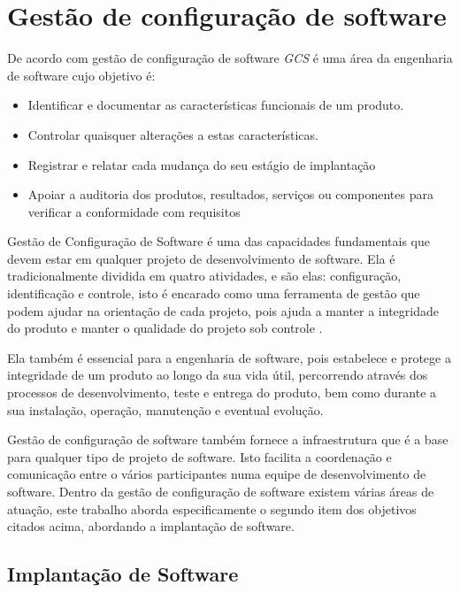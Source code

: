 \chapter{Gestão de configuração de software}
\label{cap-referencial}

De acordo com  gestão de configuração de software \textit{GCS} 
é uma área da engenharia de software cujo objetivo é:

\begin{itemize}
  \item Identificar e documentar as características funcionais de
  um produto.
  \item Controlar quaisquer alterações a estas características.
  \item Registrar e relatar cada mudança do seu estágio de implantação
  \item Apoiar a auditoria dos produtos, resultados, serviços ou
componentes para verificar a conformidade com requisitos

\end{itemize}

Gestão de Configuração de Software é uma das capacidades fundamentais que devem
estar em qualquer projeto de desenvolvimento de software. Ela é
tradicionalmente dividida em  quatro atividades, e são elas: configuração,
identificação e controle, isto é encarado como uma ferramenta de
gestão que podem ajudar na orientação de cada projeto, pois ajuda a manter a
integridade do produto e manter o qualidade do projeto sob controle \cite{gcs}. 

Ela também é essencial para a engenharia de software, pois estabelece e protege a
integridade de um produto ao longo da sua vida útil, percorrendo através dos
processos de desenvolvimento, teste e entrega do produto, bem como
durante a sua instalação, operação, manutenção e eventual evolução\cite{ieegcs}.

Gestão de configuração de software também fornece a infraestrutura que é a base para
qualquer tipo de projeto de software. Isto facilita a coordenação e comunicação
entre o vários participantes numa equipe de desenvolvimento de software.
Dentro da gestão de configuração de software
existem várias áreas de atuação, este trabalho aborda especificamente o segundo
item dos objetivos citados acima, abordando a implantação de software\cite{gcs}.

\section{Implantação de Software}

